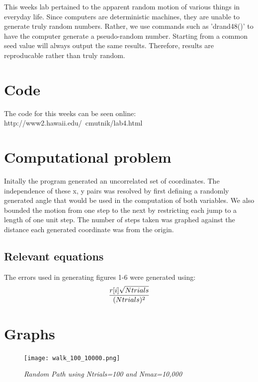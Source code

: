 \documentclass[11pt]{article}
\begin{document}
This weeks lab pertained to the apparent random motion of various things in everyday life.  Since computers are 
deterministic machines, they are unable to generate truly random numbers.  Rather, we use commands such as 
'drand48()' to have the computer generate a pseudo-random number.  Starting from a common seed value will always 
output the same results.  Therefore, results are reproducable rather than truly random. 



\section{Code}

The code for this weeks can be seen online: \\
http://www2.hawaii.edu/~cmutnik/lab4.html


\section{Computational problem}

Initally the program generated an uncorrelated set of coordinates.  The independence of these x, y pairs 
was resolved by first defining a randomly generated angle that would be used in the computation of both variables.  
We also bounded the motion from one step to the next by restricting each jump to a length of one unit step.  The 
number of steps taken was graphed against the distance each generated coordinate was from the origin.


    \subsection{Relevant equations}

The errors used in generating figures 1-6 were generated using:
\begin{equation}
\label{F}
 {r[i] \sqrt{Ntrials} \over (Ntrials)^{2}}
\end{equation}


\section{Graphs}

\begin{figure}[H]
  \begin{center}
\centerline{\texttt{[image: walk\_100\_10000.png]}}
\caption{\it \small{Random Path using Ntrials=100 and Nmax=10,000 \label{fig1}}}
  \end{center}
\end{figure}
\end{document}
